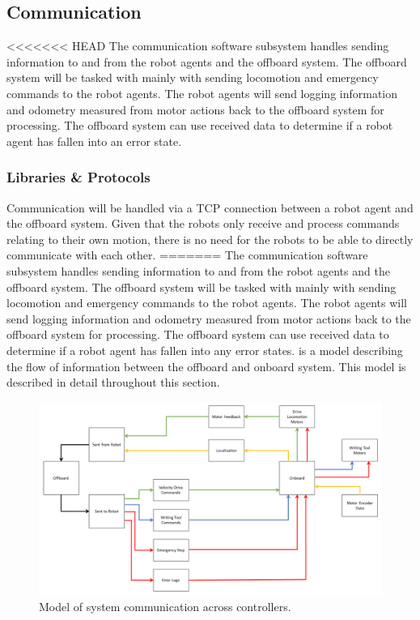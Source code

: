 
\subsection{Communication}
\label{sec:software_comm}

<<<<<<< HEAD
The communication software subsystem handles sending information to and from the robot agents and the offboard system. The offboard system will be tasked with mainly with sending locomotion and emergency commands to the robot agents. The robot agents will send logging information and odometry measured from motor actions back to the offboard system for processing. The offboard system can use received data to determine if a robot agent has fallen into an error state.

\subsubsection{Libraries \& Protocols}
\label{sec:software_comm_libs}
Communication will be handled via a TCP connection between a robot agent and the offboard system. Given that the robots only receive and process commands relating to their own motion, there is no need for the robots to be able to directly communicate with each other. 
=======
The communication software subsystem handles sending information to and from the robot agents and the offboard system. The offboard system will be tasked with mainly with sending locomotion and emergency commands to the robot agents. The robot agents will send logging information and odometry measured from motor actions back to the offboard system for processing. The offboard system can use received data to determine if a robot agent has fallen into any error states.  is a model describing the flow of information between the offboard and onboard system. This model is described in detail throughout this section.

\begin{figure}
\centering
\includegraphics[width=0.9\columnwidth]{figs/sw_arch_communication.png}
\caption{Model of system communication across controllers.}
\label{fig:software_comm_model}
\end{figure}

